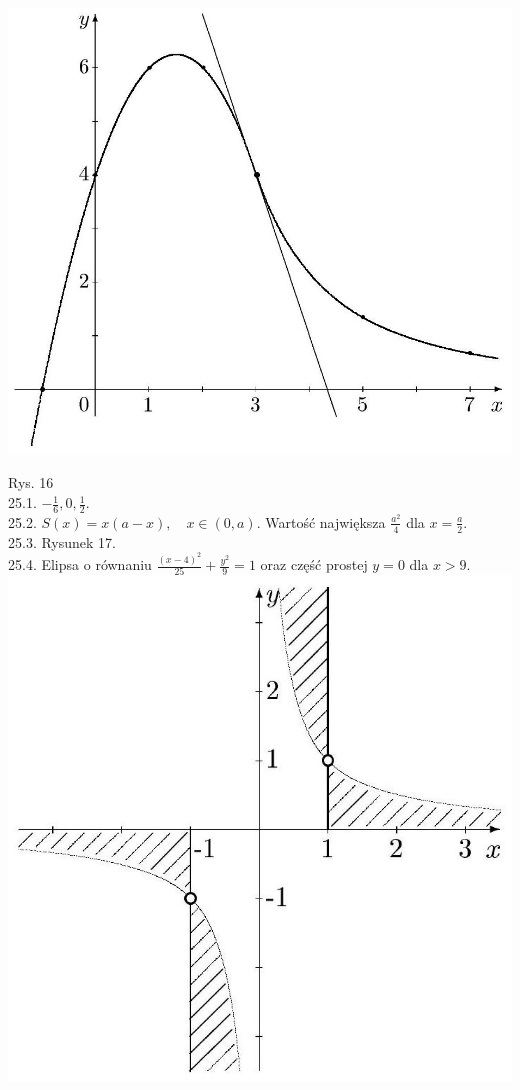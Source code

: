 \documentclass[10pt]{article}
\begin{document}
\includegraphics[max width=\textwidth, center]{2024_11_16_fe5b564401bf7db98894g-071}

Rys. 16\\
25.1. $-\frac{1}{6}, 0, \frac{1}{2}$.\\
25.2. $S(x)=x(a-x), \quad x \in(0, a)$. Wartość największa $\frac{a^{2}}{4}$ dla $x=\frac{a}{2}$.\\
25.3. Rysunek 17.\\
25.4. Elipsa o równaniu $\frac{(x-4)^{2}}{25}+\frac{y^{2}}{9}=1$ oraz część prostej $y=0$ dla $x>9$.\\
\includegraphics[max width=\textwidth, center]{2024_11_16_fe5b564401bf7db98894g-072}
\end{document}
